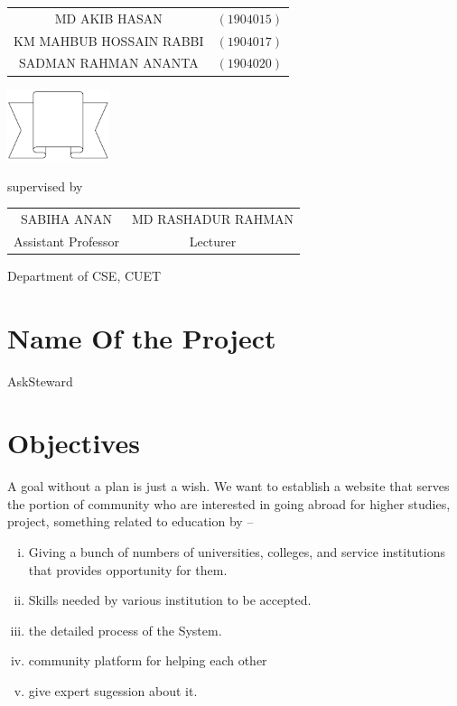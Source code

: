 \documentclass[a4paper,12pt]{report}
\begin{document}
\begin{titlepage}
{		\begin{tabular}{cl}
			MD AKIB HASAN           & $(1904015)$ \\
			KM MAHBUB HOSSAIN RABBI & $(1904017)$ \\
			SADMAN RAHMAN ANANTA    & $(1904020)$ \\
		\end{tabular}
	}
	\parbox[r]{8cm}{
		\vspace{.5cm}
		\begin{center}
			\includegraphics[width=3cm, keepaspectratio]{remarks.png}
		\end{center}
	}

	\vspace{2cm}
	supervised by
	\vspace{.5cm}

	\begin{tabular}{cc}
		SABIHA ANAN         & MD RASHADUR RAHMAN \\
		Assistant Professor & Lecturer           \\
	\end{tabular}

	Department of CSE, CUET
	\vfill
\end{titlepage}


\onehalfspacing

\section*{Name Of the Project}
AskSteward
\section*{Objectives}
A goal without a plan is just a wish. We want to establish a website that serves the portion of community who are interested in going abroad for higher studies, project, something related to education by --
\begin{enumerate}[i.]
	\item Giving a bunch of numbers of universities, colleges, and service institutions that provides opportunity for them.
	\item Skills needed by various institution to be accepted.
	\item the detailed process of the System.
	\item community platform for helping each other
	\item give expert sugession about it.
\end{enumerate}
\end{document}
